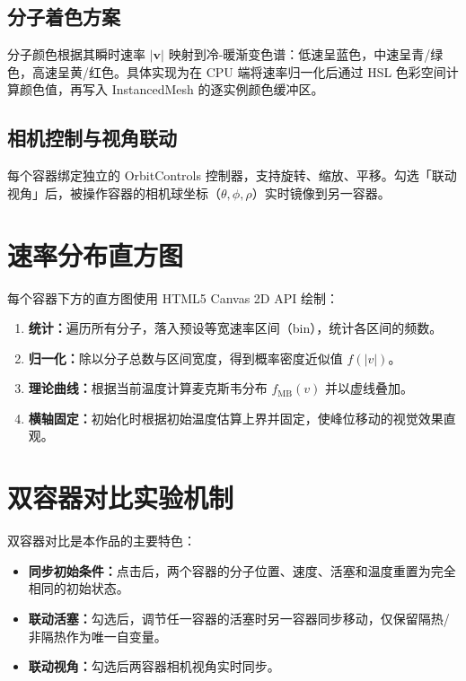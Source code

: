 \documentclass[zihao=-4,a4paper,oneside]{ctexbook}
\newcommand{\abs}[1]{\lvert#1\rvert}
\begin{document}
\subsection{分子着色方案}

分子颜色根据其瞬时速率 $\abs{\bm{v}}$ 映射到冷-暖渐变色谱：低速呈蓝色，中速呈青/绿色，高速呈黄/红色。具体实现为在 CPU 端将速率归一化后通过 HSL 色彩空间计算颜色值，再写入 InstancedMesh 的逐实例颜色缓冲区。

\subsection{相机控制与视角联动}

每个容器绑定独立的 OrbitControls 控制器，支持旋转、缩放、平移。勾选「联动视角」后，被操作容器的相机球坐标（$\theta,\phi,\rho$）实时镜像到另一容器。

\section{速率分布直方图}

每个容器下方的直方图使用 HTML5 Canvas 2D API 绘制：

\begin{enumerate}
  \item \textbf{统计：}遍历所有分子，落入预设等宽速率区间（bin），统计各区间的频数。
  \item \textbf{归一化：}除以分子总数与区间宽度，得到概率密度近似值 $f(|v|)$。
  \item \textbf{理论曲线：}根据当前温度计算麦克斯韦分布 $f_{\text{MB}}(v)$ 并以虚线叠加。
  \item \textbf{横轴固定：}初始化时根据初始温度估算上界并固定，使峰位移动的视觉效果直观。
\end{enumerate}

\section{双容器对比实验机制}

双容器对比是本作品的主要特色：

\begin{itemize}
  \item \textbf{同步初始条件：}点击后，两个容器的分子位置、速度、活塞和温度重置为完全相同的初始状态。
  \item \textbf{联动活塞：}勾选后，调节任一容器的活塞时另一容器同步移动，仅保留隔热/非隔热作为唯一自变量。
  \item \textbf{联动视角：}勾选后两容器相机视角实时同步。
\end{itemize}
\end{document}
